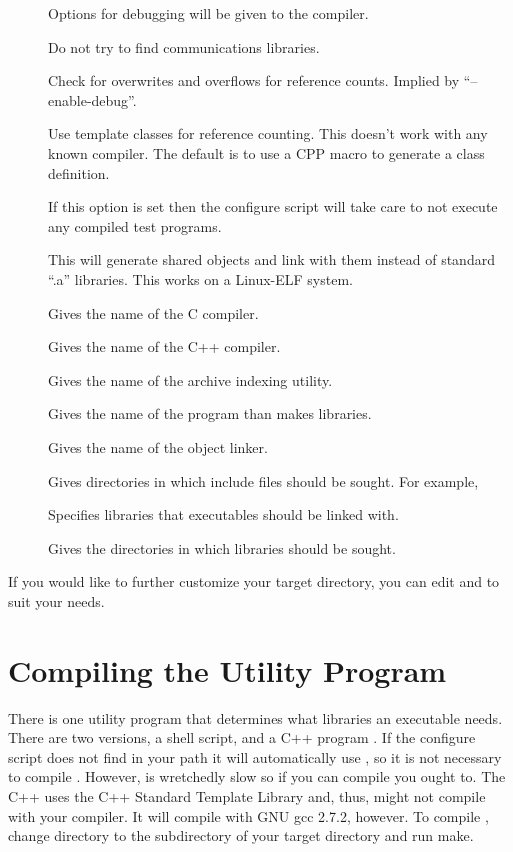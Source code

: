 \begin{description}
\item[] Options for debugging will be given to
the compiler.
\item[] Do not try to find communications
libraries.
\item[] Check for overwrites and overflows
for reference counts.  Implied by ``--enable-debug''.
\item[] Use template classes for reference
counting.  This doesn't work with any known compiler.  The default is to
use a CPP macro to generate a class definition.
\item[] If this option is set then the
configure script will take care to not execute any compiled test programs.
\item[] This will generate shared objects and
link with them instead of standard ``.a'' libraries.  This works on a
Linux-ELF system.
\item[] Gives the name of the C compiler.
\item[] Gives the name of the C++ compiler.
\item[] Gives the name of the archive indexing utility.
\item[] Gives the name of the program than makes libraries.
\item[] Gives the name of the object linker.
\item[] Gives directories in which include files
should be sought.  For example, 
\item[] Specifies libraries that executables should be
linked with.
\item[] Gives the directories in which libraries
should be sought.
\end{description}

  If you would like to further customize your target directory,
you can edit  and  to
suit your needs.

\section{Compiling the Utility Program}

 There is one utility program that determines what libraries an executable
needs.  There are two versions, a shell script,  and a
C++ program .  If the configure script does not find
 in your path it will automatically use
, so it is not necessary to compile .
However,  is wretchedly slow so if you can compile
 you ought to.  The C++  uses the C++
Standard Template Library and, thus, might not compile with your compiler.
It will compile with GNU gcc 2.7.2, however.  To compile ,
change directory to the  subdirectory of your
target directory and run make.

